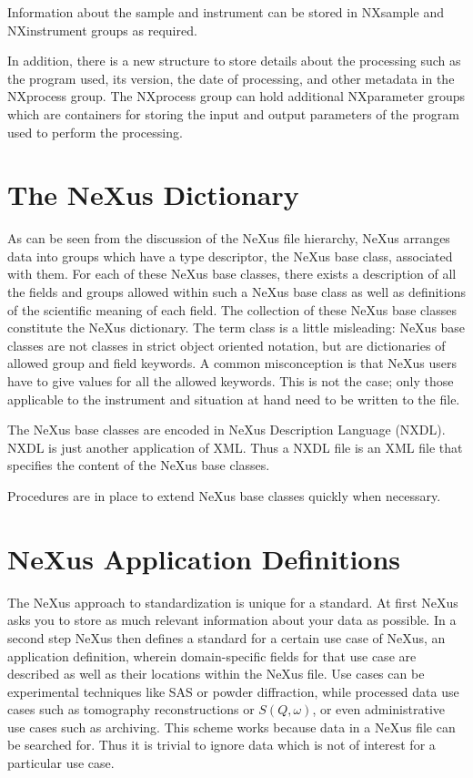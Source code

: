 \documentclass[%
 aip,
rsi,
 amsmath,amssymb,
 reprint,%
]{revtex4-1}
\begin{document}
Information about the sample and instrument can be stored in NXsample and NXinstrument groups as required. 

In addition, there is a new structure to store details about the processing such as the program used, its version, 
the date of processing, and other metadata 
in the NXprocess group. The NXprocess group can hold additional NXparameter groups which are containers 
for storing the input and output parameters of the program used to perform the processing. 


\section{The NeXus Dictionary}

As can be seen from the discussion of the NeXus file hierarchy, NeXus arranges data into groups which have a 
type descriptor, the NeXus base class, associated with them. For each of these NeXus base classes, there 
exists a description of all the fields and groups allowed within such a NeXus base class as well as definitions 
of the scientific meaning of each field. The collection of these NeXus base classes constitute the NeXus dictionary. 
The term class is a little misleading: NeXus base classes are not classes in strict object oriented notation, but 
are dictionaries of allowed group and field keywords. A common misconception is that NeXus users have to give values for all the allowed keywords.
This is not the case; only those applicable to the instrument and situation at hand need to be written to the file.

The NeXus base classes are encoded in NeXus Description Language (NXDL)\cite{nxman}. NXDL is 
just another application of XML. Thus a NXDL file is an XML file that specifies the content of the NeXus base classes. 

Procedures are in place to extend NeXus base classes quickly when necessary.


\section{NeXus Application Definitions}
  \label{sect_appdef}

The NeXus approach to standardization is unique for a standard. At first NeXus asks you to store 
as much relevant information about your data as possible. In a second step NeXus then defines a 
standard for a certain use case of NeXus, an application definition, wherein domain-specific fields 
for that use case are described as well as their locations within the NeXus file.
Use cases can be experimental techniques like SAS or 
powder diffraction, while processed data use cases such as tomography reconstructions or $S(Q,\omega)$, 
or even administrative use cases such as archiving. This scheme works because data in a NeXus file 
can be searched for. Thus it is trivial to ignore data which is not of interest for a particular use case.
\end{document}
